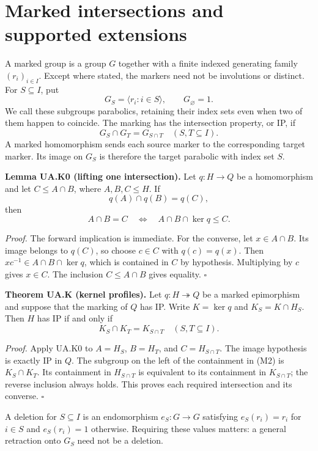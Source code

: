 \section{Marked intersections and supported extensions}\label{marked-intersections-and-supported-extensions}

A marked group is a group \(G\) together with a finite indexed generating family \((r_i)_{i\in I}\). Except where stated, the markers need not be involutions or distinct. For \(S\subseteq I\), put
\[
G_S=\langle r_i:i\in S\rangle,\qquad G_\varnothing=1.
\]
We call these subgroups parabolics, retaining their index sets even when two of them happen to coincide. The marking has the intersection property, or IP, if
\[
G_S\cap G_T=G_{S\cap T}\quad(S,T\subseteq I).
\tag{M1}
\]
A marked homomorphism sends each source marker to the corresponding target marker. Its image on \(G_S\) is therefore the target parabolic with index set \(S\).

\textbf{Lemma UA.K0 (lifting one intersection).} Let \(q:H\to Q\) be a homomorphism and let \(C\leq A\cap B\), where \(A,B,C\leq H\). If
\[
q(A)\cap q(B)=q(C),
\]
then
\[
A\cap B=C\quad\Longleftrightarrow\quad A\cap B\cap\ker q\leq C.
\tag{M2}
\]

\emph{Proof.} The forward implication is immediate. For the converse, let \(x\in A\cap B\). Its image belongs to \(q(C)\), so choose \(c\in C\) with \(q(c)=q(x)\). Then \(xc^{-1}\in A\cap B\cap\ker q\), which is contained in \(C\) by hypothesis. Multiplying by \(c\) gives \(x\in C\). The inclusion \(C\leq A\cap B\) gives equality. \(\square\)

\textbf{Theorem UA.K (kernel profiles).} Let \(q:H\twoheadrightarrow Q\) be a marked epimorphism and suppose that the marking of \(Q\) has IP. Write \(K=\ker q\) and \(K_S=K\cap H_S\). Then \(H\) has IP if and only if
\[
K_S\cap K_T=K_{S\cap T}\quad(S,T\subseteq I).
\tag{M3}
\]

\emph{Proof.} Apply UA.K0 to \(A=H_S\), \(B=H_T\), and \(C=H_{S\cap T}\). The image hypothesis is exactly IP in \(Q\). The subgroup on the left of the containment in (M2) is \(K_S\cap K_T\). Its containment in \(H_{S\cap T}\) is equivalent to its containment in \(K_{S\cap T}\); the reverse inclusion always holds. This proves each required intersection and its converse. \(\square\)



A deletion for \(S\subseteq I\) is an endomorphism \(e_S:G\to G\) satisfying \(e_S(r_i)=r_i\) for \(i\in S\) and \(e_S(r_i)=1\) otherwise. Requiring these values matters: a general retraction onto \(G_S\) need not be a deletion.

